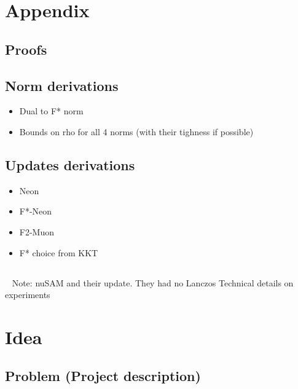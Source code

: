 \documentclass{article} %
\begin{document}
\section{Appendix}
\subsection{Proofs}
\subsection{Norm derivations}
\begin{itemize}
    \item Dual to F* norm
    \item Bounds on rho for all 4 norms (with their tighness if possible)
\end{itemize}
\subsection{Updates derivations}
\begin{itemize}
    \item Neon
    \item F*-Neon
    \item F2-Muon
    \item F* choice from KKT
\end{itemize}
\subsection{}
~ Note: nuSAM and their update. They had no Lanczos
Technical details on experiments


\section{Idea}

\subsection{Problem (Project description)}
\end{document}
